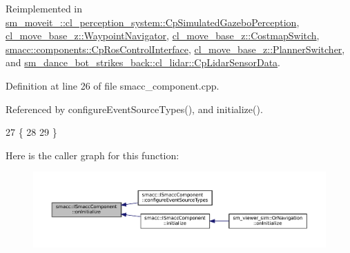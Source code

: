 Reimplemented in \hyperlink{classsm__moveit__4_1_1cl__perception__system_1_1CpSimulatedGazeboPerception_adebc30f6b1fc905f783de3f7bdf4a711}{sm\+\_\+moveit\+\_\+::cl\+\_\+perception\+\_\+system\+::\+Cp\+Simulated\+Gazebo\+Perception}, \hyperlink{classcl__move__base__z_1_1WaypointNavigator_a75f7b66878f380dd81516fbd7cb3640d}{cl\+\_\+move\+\_\+base\+\_\+z\+::\+Waypoint\+Navigator}, \hyperlink{classcl__move__base__z_1_1CostmapSwitch_ad4d125cd563ed0bb76d27226bc47e63e}{cl\+\_\+move\+\_\+base\+\_\+z\+::\+Costmap\+Switch}, \hyperlink{classsmacc_1_1components_1_1CpRosControlInterface_a469bdb5723a9ab66d6b0a7908d5891bf}{smacc\+::components\+::\+Cp\+Ros\+Control\+Interface}, \hyperlink{classcl__move__base__z_1_1PlannerSwitcher_a36bc2b9788f03a1ca02b954c625ef4c5}{cl\+\_\+move\+\_\+base\+\_\+z\+::\+Planner\+Switcher}, and \hyperlink{classsm__dance__bot__strikes__back_1_1cl__lidar_1_1CpLidarSensorData_a138dad9a855d5d4962410374d0a29d30}{sm\+\_\+dance\+\_\+bot\+\_\+strikes\+\_\+back\+::cl\+\_\+lidar\+::\+Cp\+Lidar\+Sensor\+Data}.



Definition at line 26 of file smacc\+\_\+component.\+cpp.



Referenced by configure\+Event\+Source\+Types(), and initialize().


\begin{DoxyCode}
27 \{
28 
29 \}
\end{DoxyCode}
Here is the caller graph for this function\+:
\nopagebreak
\begin{figure}[H]
\begin{center}
\leavevmode
\includegraphics[width=350pt]{classsmacc_1_1ISmaccComponent_ae6f71d008db12553912e9436184b9e65_icgraph}
\end{center}
\end{figure}
\mbox{\label{classsmacc_1_1ISmaccComponent_a687dead5b87a3b9781b9bf6ab0b7afa5}} 
